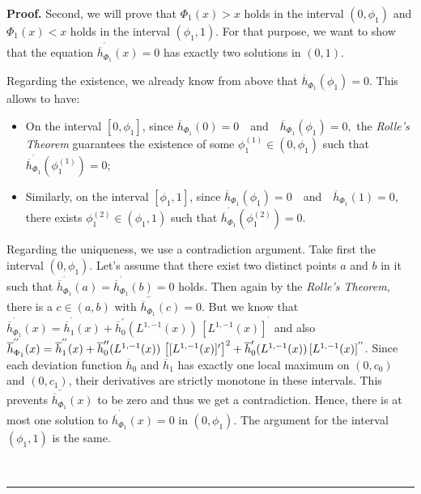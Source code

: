 \documentclass[onecolumn]{article}
\newenvironment{proof}[1][Proof]{\noindent\textbf{#1.} }{\ \rule{0.5em}{0.5em}}
\begin{document}
\begin{proof}
Second, we will prove that $\Phi _{1}(x)>x$ holds in the interval $(0,\phi
_{1})$ and $\Phi _{1}(x)<x$ holds in the interval $(\phi _{1},1).$ For that
purpose, we want to show that the equation $\overline{h}_{\Phi
_{1}}^{^{\prime }}(x)=0$ has exactly two solutions in $(0,1)$.

Regarding the existence, we already know from above that $\overline{h}_{\Phi
_{1}}(\phi _{1})=0$. This allows to have:

\begin{itemize}
\item On the interval $[0,\phi _{1}]$, since $\overline{h}_{\Phi
_{1}}(0)=0\quad $and$\quad \overline{h}_{\Phi _{1}}(\phi _{1})=0,$ the 
\textit{Rolle's Theorem} guarantees the existence of some $\phi
_{1}^{(1)}\in (0,\phi _{1})$ such that $\overline{h}_{\Phi _{1}}^{^{\prime
}}(\phi _{1}^{(1)})=0;$

\item Similarly, on the interval $[\phi _{1},1]$, since $\overline{h}_{\Phi
_{1}}(\phi _{1})=0\quad $and$\quad \overline{h}_{\Phi _{1}}(1)=0$, there
exists $\phi _{1}^{(2)}\in (\phi _{1},1)$ such that $\overline{h}_{\Phi
_{1}}^{^{\prime }}(\phi _{1}^{(2)})=0.$
\end{itemize}

Regarding the uniqueness, we use a contradiction argument. Take first the
interval $(0,\phi _{1})$. Let's assume that there exist two distinct points $%
a$ and $b$ in it such that $\overline{h}_{\Phi _{1}}^{^{\prime }}(a)=%
\overline{h}_{\Phi _{1}}^{^{\prime }}(b)=0$ holds. Then again by the \textit{%
Rolle's Theorem}, there is a $c\in (a,b)$ with $\overline{h}_{\Phi
_{1}}^{^{\prime \prime }}(c)=0$. But we know that $\overline{h}_{\Phi
_{1}}^{^{\prime }}(x)=\overline{h}_{1}^{^{\prime }}(x)+\overline{h}%
_{0}^{\prime }(L^{1,-1}(x))\,[L^{1,-1}(x)]^{^{\prime }}$ and also $\overline{%
h}_{\Phi _{1}}^{^{\prime \prime }}(x)=\overline{h}_{1}^{^{\prime \prime
}}(x)+\overline{h}_{0}^{\prime \prime }(L^{1,-1}(x))\,\left[
[L^{1,-1}(x)]^{\prime }\right] ^{2}+\overline{h}_{0}^{\prime
}(L^{1,-1}(x))\,[L^{1,-1}(x)]^{^{\prime \prime }}$. Since each deviation
function $\overline{h}_{0}$ and $\overline{h}_{1}$ has exactly one local
maximum on $(0,c_{0})$ and $(0,c_{1})$, their derivatives are strictly
monotone in these intervals. This prevents $\overline{h}_{\Phi
_{1}}^{^{\prime \prime }}(x)$ to be zero and thus we get a contradiction.
Hence, there is at most one solution to $\overline{h}_{\Phi _{1}}^{^{\prime
}}(x)=0$ in $(0,\phi _{1})$. The argument for the interval $(\phi _{1},1)$
is the same.


\end{proof}
\end{document}
